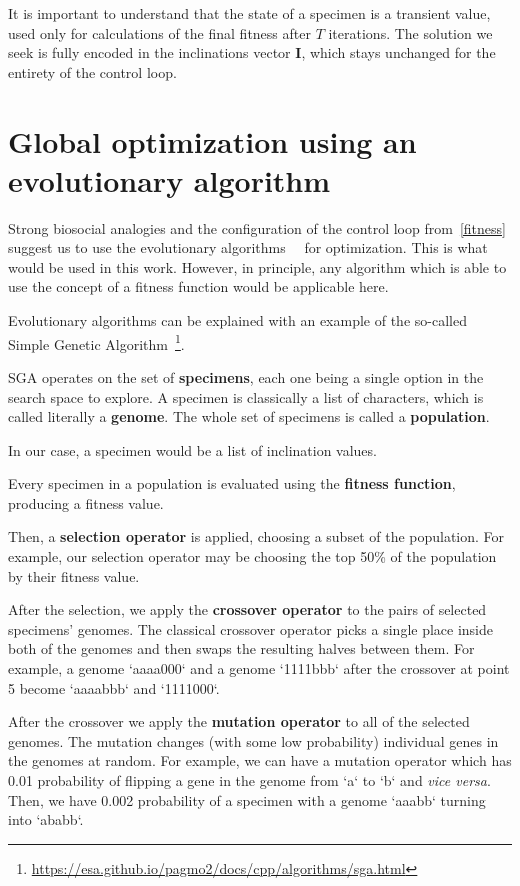 \documentclass[12pt, a4paper]{report}
\begin{document}
  It is important to understand that the state of a specimen is a transient value, used only for calculations of the final fitness after $T$ iterations.
  The solution we seek is fully encoded in the inclinations vector $\mathbf{I}$, which stays unchanged for the entirety of the control loop.

	\section{Global optimization using an evolutionary algorithm}\label{section::evolutionary}

	Strong biosocial analogies and the configuration of the control loop from~\ref{fitness} suggest us to use the evolutionary algorithms~\cite{song2023rl_ea}~\cite{beyer2002evolution_strategies} for optimization.
	This is what would be used in this work.
	However, in principle, any algorithm which is able to use the concept of a fitness function would be applicable here.

  Evolutionary algorithms can be explained with an example of the so-called Simple Genetic Algorithm~\footnote{\url{https://esa.github.io/pagmo2/docs/cpp/algorithms/sga.html}}.

  SGA operates on the set of \textbf{specimens}, each one being a single option in the search space to explore.
  A specimen is classically a list of characters, which is called literally a \textbf{genome}.
  The whole set of specimens is called a \textbf{population}.

  In our case, a specimen would be a list of inclination values.

  Every specimen in a population is evaluated using the \textbf{fitness function}, producing a fitness value.

  Then, a \textbf{selection operator} is applied, choosing a subset of the population.
  For example, our selection operator may be choosing the top 50\% of the population by their fitness value.

  After the selection, we apply the \textbf{crossover operator} to the pairs of selected specimens' genomes.
  The classical crossover operator picks a single place inside both of the genomes and then swaps the resulting halves between them.
  For example, a genome `aaaa000` and a genome `1111bbb` after the crossover at point 5 become `aaaabbb` and `1111000`.

  After the crossover we apply the \textbf{mutation operator} to all of the selected genomes.
  The mutation changes (with some low probability) individual genes in the genomes at random.
  For example, we can have a mutation operator which has 0.01 probability of flipping a gene in the genome from `a` to `b` and \textit{vice versa}.
  Then, we have 0.002 probability of a specimen with a genome `aaabb` turning into `ababb`.
\end{document}
